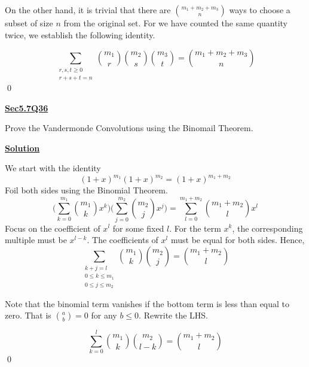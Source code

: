 \documentclass{article}
\newcommand{\new}[1]{
    \vspace{2mm}
    \noindent
    \textbf{
    \underline{#1}}
}
\begin{document}
On the other hand, it is trivial that there are $\binom{m_1+m_2+m_3}{n}$
ways to choose a subset of size $n$ from the original set. For 
we have counted the same quantity twice, we establish the 
following identity. 

\[
    \sum_{\substack{r, s, t \geq 0\\r + s + t = n}}
    \binom{m_1}{r} \binom{m_2}{s} \binom{m_3}{t}
    =
\binom{m_1+m_2+m_3}{n}
\]
\hfill \qed

\new{Sec5.7Q36} 
Prove the Vandermonde Convolutions using the Binomail Theorem. 

\new{Solution}
We start with the identity 
\[
    (1+x)^{m_1}(1+x)^{m_2} = (1+x)^{m_1+m_2}
\]
Foil both sides using the Binomial Theorem. 
\[
    \bigg(\sum_{k = 0}^{m_1} \binom{m_1}{k} x^k\bigg)
    \bigg(\sum_{j = 0}^{m_2} \binom{m_2}{j} x^j\bigg)
    = 
    \sum_{l = 0}^{m_1 + m_2} \binom{m_1 + m_2}{l} x^l
\]
Focus on the coefficient of $x^l$ for some fixed $l$. 
For the term $x^k$, the corresponding multiple must be $x^{l - k}$. 
The coefficients of $x^l$ must be equal for both sides. Hence, 
\[
    \sum_{
        \substack{
            k + j = l \\
            0 \leq k \leq m_1 \\ 
            0 \leq j \leq m_2
        }
    }
        \binom{m_1}{k}
        \binom{m_2}{j}
    = \binom{m_1 + m_2}{l}
\]

Note that the binomial term vanishes if the bottom term is less 
than equal to zero. That is $\binom{a}{b} = 0$ for any $b \leq 0$. 
Rewrite the LHS. 

\[
    \sum_{
        k = 0
    }
    ^{l}
        \binom{m_1}{k}
        \binom{m_2}{l - k}
    = 
\binom{m_1 + m_2}{l}
\]
\hfill \qed
\end{document}

